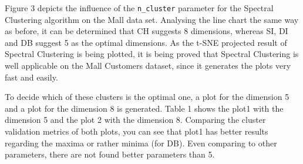  
 Figure 3 depicts the influence of the \verb|n_cluster| parameter for the Spectral Clustering algorithm on the Mall data set. Analysing the line chart the same way as before, it can be determined that CH suggests 8 dimensions, whereas SI, DI and DB suggest 5 as the optimal dimensions. As the t-SNE projected result of Spectral Clustering is being plotted, it is being proved that Spectral Clustering is well applicable on the Mall Customers dataset, since it generates the plots very fast and easily. \newline
 
 
To decide which of these clusters is the optimal one, a plot for the dimension 5 and a plot for the dimension 8 is generated. Table 1 shows the plot1 with the dimension 5 and the plot 2 with the dimension 8. Comparing the cluster validation metrics of both plots, you can see that plot1 has better results regarding the maxima or rather minima (for DB). Even comparing to other parameters, there are not found better parameters than 5.\newline

\hspace{-0.75cm}
\begin{table}[H]
\caption{Comparison Cluster validation of Plot1 and Plot2 with Spectral Clustering}
\label{tab:evalutaion_table_spectral}
\end{table}
 
